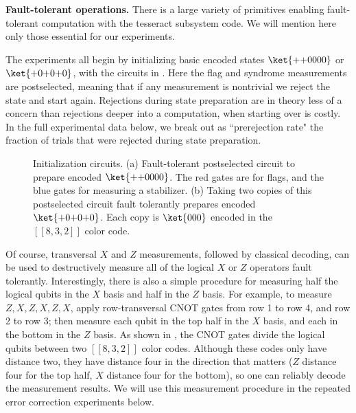 \documentclass[10pt, twocolumn, aps, nofootinbib, longbibliography, nobibnotes, superscriptaddress]{revtex4-1} %
\begin{document}

\medskip
\noindent
\textbf{Fault-tolerant operations.}
There is a large variety of primitives enabling fault-tolerant computation with the tesseract subsystem code.  
We will mention here only those essential for our experiments.  

The experiments all begin by initializing basic encoded states $\ket{{+}{+}0000}$ or $\ket{{+}0{+}0{+}0}$, with the circuits in .  Here the flag and syndrome measurements are postselected, meaning that if any measurement is nontrivial we reject the state and start again.  Rejections during state preparation are in theory less of a concern than rejections deeper into a computation, when starting over is costly.  In the full experimental data below, we break out as ``prerejection rate" the fraction of trials that were rejected during state preparation.  

\begin{figure}
\caption{Initialization circuits.  (a) Fault-tolerant postselected circuit to prepare encoded $\ket{{+}{+}0000}$.  The red gates are for flags, and the blue gates for measuring a stabilizer.  
(b) Taking two copies of this postselected circuit fault tolerantly prepares encoded $\ket{{+}0{+}0{+}0}$.  Each copy is $\ket{000}$ encoded in the $[[8,3,2]]$ color code.  
}
\label{f:initialization}
\end{figure}

Of course, transversal $X$ and $Z$ measurements, followed by classical decoding, can be used to destructively measure all of the logical $X$ or $Z$ operators fault tolerantly.  Interestingly, there is also a simple procedure for measuring half the logical qubits in the $X$ basis and half in the $Z$ basis.  
For example, to measure $Z, X, Z, X, Z, X$, apply row-transversal CNOT gates from row 1 to row 4, and row 2 to row 3; then measure each qubit in the top half in the $X$ basis, and each in the bottom in the $Z$ basis.  As shown in , the CNOT gates divide the logical qubits between two $[[8,3,2]]$ color codes.  Although these codes only have distance two, they have distance four in the direction that matters ($Z$ distance four for the top half, $X$ distance four for the bottom), so one can reliably decode the measurement results.  
We will use this measurement procedure in the repeated error correction experiments below.  
\end{document}
